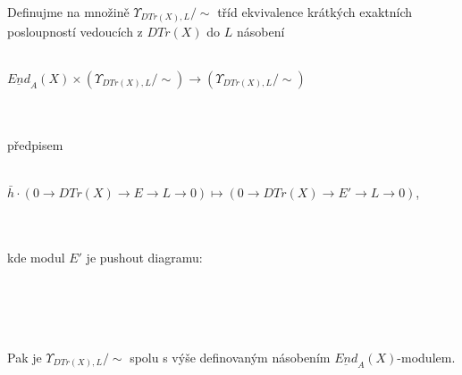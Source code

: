         \begin{lem}\label{upsilon-je-modul}
          Definujme na množině $\Upsilon_{DTr(X),L}/\sim$ tříd ekvivalence krátkých exaktních posloupností 
          vedoucích z $DTr(X)$ do $L$ násobení \\\\
          \centerline{$\underline{End}_A(X)\times (\Upsilon_{DTr(X),L}/\sim) \rightarrow (\Upsilon_{DTr(X),L}/\sim)$} 
          \\\\
          předpisem  \\\\
          \centerline{$
            \bar{h} 
            \cdot 
            (0\rightarrow DTr(X)\rightarrow E\rightarrow L\rightarrow 0)
            \mapsto
            (0\rightarrow DTr(X)\rightarrow E'\rightarrow L\rightarrow 0)
          $,} 
          \\\\
          kde modul $E'$ je pushout diagramu: \\\\
          \centerline{}\\\\\\
          Pak je $\Upsilon_{DTr(X),L}/\sim$ spolu s výše definovaným násobením  
          $\underline{End}_A(X)$-modulem.
        \end{lem}
